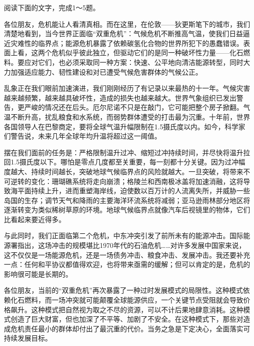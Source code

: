\documentclass[11pt,a4paper]{ctexart}
\begin{document}


阅读下面的文字，完成1～5题。

\begin{materialtext}
各位朋友，危机能让人看清真相。而在这里，在伦敦——狄更斯笔下的城市，我们清楚地看到，当今世界正面临“双重危机”：气候危机不断推高气温，使我们日益逼近灾难性的临界点；能源危机暴露了依赖碳氢化合物的世界所犯下的愚蠢错误。表面上看，这两个危机似乎彼此独立，但驱动它们的是同一种破坏性力量——化石燃料。要应对它们，也必须采取同一种方案：快速、公平地向清洁能源转型，同时大力加强适应能力、韧性建设和对已遭受气候危害群体的气候公正。

乱象正在我们眼前加速演进，我们刚刚经历了有记录以来最热的十一年。气候灾害越来越频繁，越来越具破坏性，造成的损失也越来越大。世界气象组织已发出警告，更严峻的情况还在后头。厄尔尼诺不只是在敲门，它可能把整个房子掀翻。气温不断升高，扰乱粮食和水系统，而弱势群体遭受的打击最为沉重。十年前，世界各国领导人在巴黎商定，要将全球气温升幅限制在1.5摄氏度以内。如今，科学家们警告说，未来几年全球年均升温将超过这一阈值。

摆在我们面前的任务是：严格限制温升过冲、缩短过冲持续时间，并尽快将温升拉回1.5摄氏度以下。哪怕是零点几度都至关重要，每一刻都十分关键。因为过冲幅度越大、持续时间越长，突破地球气候临界点的风险就越大。一旦突破，将带来不可逆转的变化：珊瑚礁系统将走向崩溃；格陵兰和西南极冰盖将加速消融，这将导致海平面持续上升，进而重塑海岸线，迫使数以百万计的人流离失所，并威胁一些岛国的生存；调节天气和降雨的主要海洋环流系统将减弱；亚马逊雨林部分地区将逐渐转变为类似稀树草原的环境。地球气候临界点就像汽车后视镜里的物体，它们比看起来要近得多。

与此同时，我们正面临第二个危机，中东冲突引发了前所未有的能源冲击。国际能源署指出，这场冲击的规模堪比1970年代的石油危机……对许多发展中国家来说，这不仅仅是一场能源危机，还是一场债务冲击、粮食冲击、发展冲击。我还要补充一点：任何和平协议都值得欢迎，也将带来亟需的缓解；但可以肯定的是，危机的影响很可能是长期的。

各位朋友，当前的“双重危机”再次暴露了一种过时发展模式的局限性。这种模式依赖化石燃料，而一场冲突就可能颠覆全球能源供应，一个关键节点受阻就会导致价格飙升。这种模式把自然视为取之不尽的资源，可以不计后果地肆意消耗。这种模式创造了巨大财富，但也加深了不平等、加剧了不安全。在这种模式下，那些对造成危机责任最小的群体却付出了最沉重的代价。当务之急是下定决心，全面落实可持续发展目标。


\end{materialtext}
\end{document}
